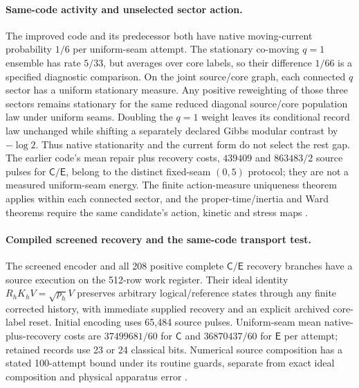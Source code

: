 \documentclass[11pt]{article}
\theoremstyle{definition}
\theoremstyle{remark}
\theoremstyle{plain}
\newcommand{\Cn}{\mathsf{C}}
\newcommand{\En}{\mathsf{E}}
\begin{document}
\paragraph{Same-code activity and unselected sector action.}
The improved code and its predecessor both have native moving-current
probability $1/6$ per uniform-seam attempt. The stationary co-moving
$q=1$ ensemble has rate $5/33$, but averages over core labels, so their
difference $1/66$ is a specified diagnostic comparison. On the joint
source/core graph, each connected $q$ sector has a uniform stationary
measure. Any positive reweighting of those three sectors remains
stationary for the same reduced diagonal source/core population law under
uniform seams. Doubling the $q=1$ weight leaves its
conditional record law unchanged while shifting a separately declared
Gibbs modular contrast by $-\log2$. Thus native stationarity and the
current form do not select the rest gap. The earlier code's mean repair
plus recovery costs, $439409$ and $863483/2$ source pulses for $\Cn/\En$,
belong to the distinct fixed-seam $(0,5)$ protocol; they are not a measured
uniform-seam energy. The finite action-measure uniqueness theorem applies
within each connected sector, and the proper-time/inertia and Ward theorems
require the same candidate's action, kinetic and stress maps
\cite{activeCodeEnergy}.

\paragraph{Compiled screened recovery and the same-code transport test.}
The screened encoder and all 208 positive complete $\Cn/\En$ recovery
branches have a source execution on the 512-row work register. Their ideal
identity $R_hK_hV=\sqrt{p_h}V$ preserves arbitrary logical/reference states
through any finite corrected history, with immediate supplied recovery and
an explicit archived core-label reset. Initial encoding uses 65,484 source
pulses. Uniform-seam mean native-plus-recovery costs are $37499681/60$ for
$\Cn$ and $36870437/60$ for $\En$ per attempt; retained records use 23 or
24 classical bits. Numerical source composition has a stated 100-attempt
bound under its routine guards, separate from exact ideal composition and
physical apparatus error \cite{screenedRecovery}.
\end{document}
